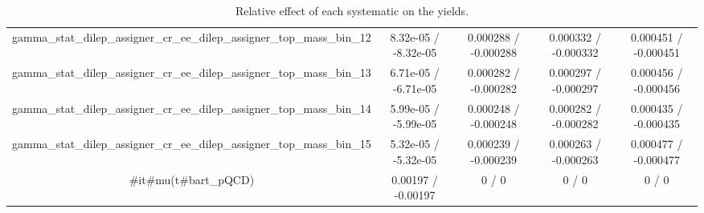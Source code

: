 \documentclass[10pt]{article}
\begin{document}
\begin{table}[htbp]
\begin{center}
\begin{tabular}{|c|c|c|c|c|}
  gamma_stat_dilep_assigner_cr_ee_dilep_assigner_top_mass_bin_12 & 8.32e-05 / -8.32e-05 & 0.000288 / -0.000288 & 0.000332 / -0.000332 & 0.000451 / -0.000451 \\ 
  gamma_stat_dilep_assigner_cr_ee_dilep_assigner_top_mass_bin_13 & 6.71e-05 / -6.71e-05 & 0.000282 / -0.000282 & 0.000297 / -0.000297 & 0.000456 / -0.000456 \\ 
  gamma_stat_dilep_assigner_cr_ee_dilep_assigner_top_mass_bin_14 & 5.99e-05 / -5.99e-05 & 0.000248 / -0.000248 & 0.000282 / -0.000282 & 0.000435 / -0.000435 \\ 
  gamma_stat_dilep_assigner_cr_ee_dilep_assigner_top_mass_bin_15 & 5.32e-05 / -5.32e-05 & 0.000239 / -0.000239 & 0.000263 / -0.000263 & 0.000477 / -0.000477 \\ 
  #it{#mu}(t#bar{t}_{pQCD}) & 0.00197 / -0.00197 & 0 / 0 & 0 / 0 & 0 / 0 \\ 
\hline 
\end{tabular} 
\caption{Relative effect of each systematic on the yields.} 
\end{center} 
\end{table} 
\end{document}
